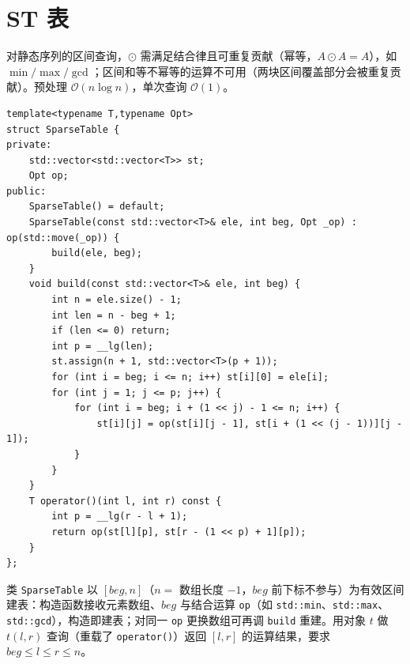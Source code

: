 \section{ST 表}

对静态序列的区间查询，$\odot$ 需满足结合律且可重复贡献（幂等，$A\odot A=A$），如 $\min/\max/\gcd$；区间和等不幂等的运算不可用（两块区间覆盖部分会被重复贡献）。预处理 $\mathcal{O}(n\log n)$，单次查询 $\mathcal{O}(1)$。

\begin{lstlisting}
template<typename T,typename Opt>
struct SparseTable {
private:
    std::vector<std::vector<T>> st;
    Opt op;
public:
    SparseTable() = default;
    SparseTable(const std::vector<T>& ele, int beg, Opt _op) : op(std::move(_op)) {
        build(ele, beg);
    }
    void build(const std::vector<T>& ele, int beg) {
        int n = ele.size() - 1;
        int len = n - beg + 1;
        if (len <= 0) return;
        int p = __lg(len);
        st.assign(n + 1, std::vector<T>(p + 1));
        for (int i = beg; i <= n; i++) st[i][0] = ele[i];
        for (int j = 1; j <= p; j++) {
            for (int i = beg; i + (1 << j) - 1 <= n; i++) {
                st[i][j] = op(st[i][j - 1], st[i + (1 << (j - 1))][j - 1]);
            }
        }
    }
    T operator()(int l, int r) const {
        int p = __lg(r - l + 1);
        return op(st[l][p], st[r - (1 << p) + 1][p]);
    }
};
\end{lstlisting}

类 \texttt{SparseTable} 以 $[beg,n]$（$n=$ 数组长度 $-1$，$beg$ 前下标不参与）为有效区间建表：构造函数接收元素数组、$beg$ 与结合运算 \texttt{op}（如 \texttt{std::min}、\texttt{std::max}、\texttt{std::gcd}），构造即建表；对同一 \texttt{op} 更换数组可再调 \texttt{build} 重建。用对象 $t$ 做 $t(l,r)$ 查询（重载了 \texttt{operator()}）返回 $[l,r]$ 的运算结果，要求 $beg\le l\le r\le n$。